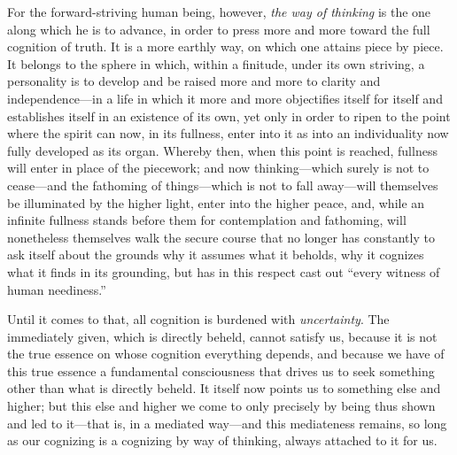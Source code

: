 \documentclass[12pt,a4paper]{book}
\begin{document}
For the forward-striving human being, however, \emph{the way of thinking} is the
one along which he is to advance, in order to press more and more toward the full
cognition of truth. It is a more earthly way, on which one attains piece by
piece. It belongs to the sphere in which, within a finitude, under its own
striving, a personality is to develop and be raised more and more to clarity and
independence---in a life in which it more and more objectifies itself for itself
and establishes itself in an existence of its own, yet only in order to ripen to
the point where the spirit can now, in its fullness, enter into it as into an
individuality now fully developed as its organ. Whereby then, when this point is
reached, fullness will enter in place of the piecework; and now thinking---which
surely is not to cease---and the fathoming of things---which is not to fall
away---will themselves be illuminated by the higher light, enter into the higher
peace, and, while an infinite fullness stands before them for contemplation and
fathoming, will nonetheless themselves walk the secure course that no longer has
constantly to ask itself about the grounds why it assumes what it beholds, why it
cognizes what it finds in its grounding, but has in this respect cast out ``every
witness of human neediness.''

Until it comes to that, all cognition is burdened with \emph{uncertainty}. The
immediately given, which is directly beheld, cannot satisfy us, because it is not
the true essence on whose cognition everything depends, and because we have of
this true essence a fundamental consciousness that drives us to seek something
other than what is directly beheld. It itself now points us to something else and
higher; but this else and higher we come to only precisely by being thus shown
and led to it---that is, in a mediated way---and this mediateness remains, so long
as our cognizing is a cognizing by way of thinking, always attached to it for us.
\end{document}
